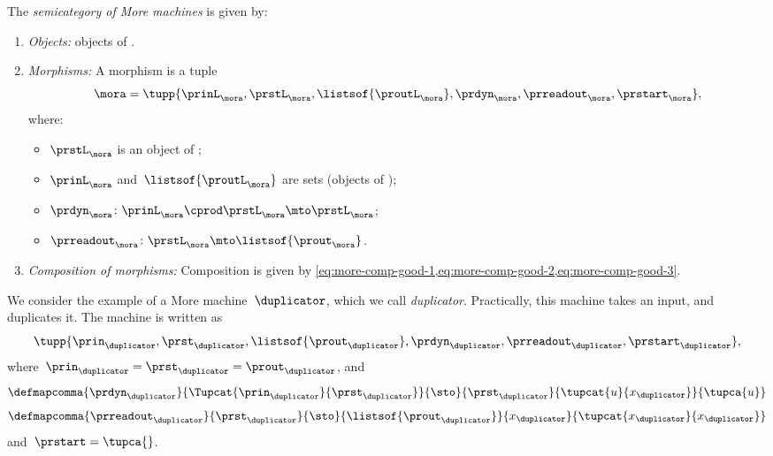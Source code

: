 \begin{definition}[\More]
    \label{def:More}
    The \emph{semicategory of More machines} \More is given by:
    \begin{enumerate}
        \item \emph{Objects:} objects of \cCat{\Set}.
        \item \emph{Morphisms:}
              A morphism is a tuple
              \begin{equation}
                  \mora = \tupp{\prinL_{\mora},\prstL_{\mora},\listsof{\proutL_{\mora}},\prdyn_{\mora},\prreadout_{\mora},\prstart_{\mora}},
              \end{equation}
              where:
              \begin{itemize}
                  \item $\prstL_{\mora}$ is an object of \SetL;
                  \item $\prinL_{\mora}$ and~$\listsof{\proutL_{\mora}}$ are sets (objects of \Set);
                  \item $ \prdyn_{\mora} \colon \prinL_{\mora} \cprod \prstL_{\mora} \mto \prstL_{\mora}$;
                  \item $ \prreadout_{\mora} \colon \prstL_{\mora}  \mto \listsof{\prout_{\mora}}$.
              \end{itemize}
        \item \emph{Composition of morphisms:}
              Composition is given by \cref{eq:more-comp-good-1,eq:more-comp-good-2,eq:more-comp-good-3}.
    \end{enumerate}
\end{definition}

\begin{example}[Duplicator]
    We consider the example of a More machine~$\duplicator$, which we call \emph{duplicator}.
    Practically, this machine takes an input, and duplicates it.
    The machine is written as
    \begin{equation*}
        \tupp{\prin_{\duplicator},\prst_{\duplicator},\listsof{\prout_{\duplicator}},\prdyn_{\duplicator},\prreadout_{\duplicator},\prstart_{\duplicator}},
    \end{equation*}
    where~$\prin_{\duplicator}=\prst_{\duplicator}=\prout_\duplicator$, and
    \begin{equation*}
        \defmapcomma{\prdyn_\duplicator}
        {\Tupcat{\prin_\duplicator}{\prst_\duplicator}}
        {\sto}
        {\prst_\duplicator}
        {\tupcat{u}{x_\duplicator}}
        {\tupca{u}}
    \end{equation*}
    \begin{equation*}
        \defmapcomma{\prreadout_\duplicator}
        {\prst_\duplicator}
        {\sto}
        {\listsof{\prout_\duplicator}}
        {x_\duplicator}
        {\tupcat{x_\duplicator}{x_\duplicator}}
    \end{equation*}
    and~$\prstart=\tupca{}$.
\end{example}


